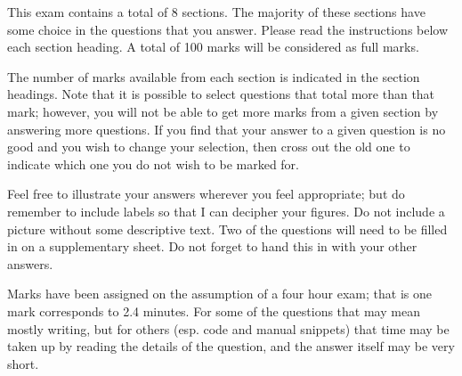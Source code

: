 \documentclass[11pt]{article}
\begin{document}
This exam contains a total of 8 sections. The majority of these sections have
some choice in the questions that you answer. Please read the instructions
below each section heading. A total of 100 marks will be considered as full marks.

The number of marks available from each section is indicated in the section
headings. Note that it is possible to select questions that total more than
that mark; however, you will not be able to get more marks from a given
section by answering more questions. If you find that your answer to a given
question is no good and you wish to change your selection, then cross out the
old one to indicate which one you do not wish to be marked for.

Feel free to illustrate your answers wherever you feel appropriate; but do
remember to include labels so that I can decipher your figures. Do not include
a picture without some descriptive text. Two of the questions will need to be
filled in on a supplementary sheet. Do not forget to hand this in with your
other answers.

Marks have been assigned on the assumption of a four hour exam; that is one mark
corresponds to 2.4 minutes. For some of the questions that may mean mostly
writing, but for others (esp. code and manual snippets) that time may be taken up by
reading the details of the question, and the answer itself may be very
short.
\end{document}
